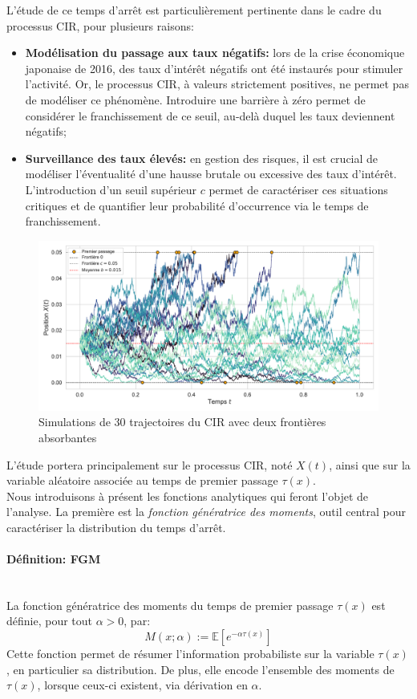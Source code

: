 L'étude de ce temps d'arrêt est particulièrement pertinente dans le cadre du processus \acs{CIR}, pour plusieurs raisons:
\begin{itemize}
    \item \textbf{Modélisation du passage aux taux négatifs:} lors de la crise économique japonaise de 2016, des taux d'intérêt négatifs ont été instaurés pour stimuler l'activité. Or, le processus \acs{CIR}, à valeurs strictement positives, ne permet pas de modéliser ce phénomène. Introduire une barrière à zéro permet de considérer le franchissement de ce seuil, au-delà duquel les taux deviennent négatifs;
    \item \textbf{Surveillance des taux élevés:} en gestion des risques, il est crucial de modéliser l'éventualité d'une hausse brutale ou excessive des taux d'intérêt. L'introduction d'un seuil supérieur $c$ permet de caractériser ces situations critiques et de quantifier leur probabilité d'occurrence via le temps de franchissement.
\end{itemize}
\begin{figure}[htb]
    \centering
    \includegraphics[width=0.9\linewidth]{img/intro/cir_first_passage.pdf}
    \caption{Simulations de 30 trajectoires du \acs{CIR} avec deux frontières absorbantes}\label{fig:FPTCIR}
\end{figure}
\FloatBarrier L'étude portera principalement sur le processus \acs{CIR}, noté $X(t)$, ainsi que sur la variable aléatoire associée au temps de premier passage $\tau(x)$.\\
Nous introduisons à présent les fonctions analytiques qui feront l'objet de l'analyse. La première est la \textit{fonction génératrice des moments}, outil central pour caractériser la distribution du temps d'arrêt.\pagebreak
\paragraph{Définition: \ac{FGM}}\mbox{}\\
La fonction génératrice des moments du temps de premier passage $\tau(x)$ est définie, pour tout $\alpha > 0$, par:
\begin{equation}\label{fgm}
    M(x;\alpha):= \mathds{E} \left[ e^{-\alpha \tau(x)} \right]
\end{equation}
Cette fonction permet de résumer l'information probabiliste sur la variable $\tau(x)$, en particulier sa distribution. De plus, elle encode l'ensemble des moments de $\tau(x)$, lorsque ceux-ci existent, via dérivation en $\alpha$. 

